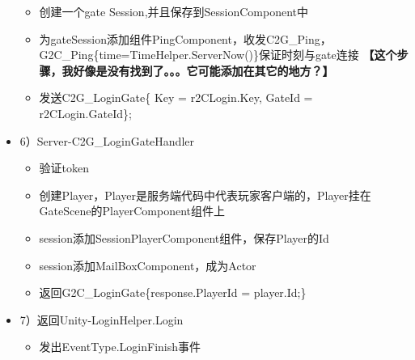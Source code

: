 \documentclass[9pt, b5paper]{article}
\begin{document}
\begin{itemize}
\begin{itemize}
\item 创建一个gate Session,并且保存到SessionComponent中
\item 为gateSession添加组件PingComponent，收发C2G\_Ping，G2C\_Ping\{time=TimeHelper.ServerNow()\}保证时刻与gate连接 \textbf{【这个步骤，我好像是没有找到了。。。它可能添加在其它的地方？】}
\item 发送C2G\_LoginGate\{ Key = r2CLogin.Key, GateId = r2CLogin.GateId\};
\end{itemize}
\item 6）Server-C2G\_LoginGateHandler
\begin{itemize}
\item 验证token
\item 创建Player，Player是服务端代码中代表玩家客户端的，Player挂在GateScene的PlayerComponent组件上
\item session添加SessionPlayerComponent组件，保存Player的Id
\item session添加MailBoxComponent，成为Actor
\item 返回G2C\_LoginGate\{response.PlayerId = player.Id;\}
\end{itemize}
\item 7）返回Unity-LoginHelper.Login
\begin{itemize}
\item 发出EventType.LoginFinish事件
\end{itemize}
\end{itemize}
\end{document}

